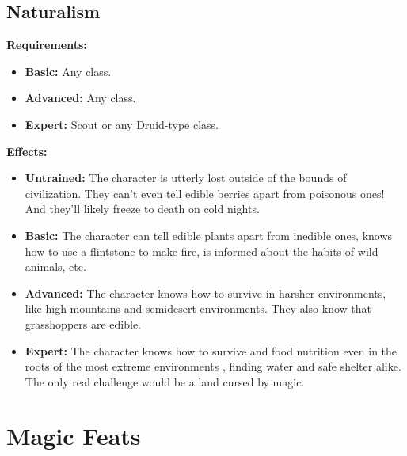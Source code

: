 \documentclass[openany,10pt,a4paper]{book}
\begin{document}
\subsection{Naturalism}
\begin{table}[!ht]
\centering
{}
\end{table}
\textbf{Requirements:}
\begin{itemize}
	\item \textbf{Basic:} Any class.
	\item \textbf{Advanced:} Any class.
	\item \textbf{Expert:} Scout or any Druid-type class.
\end{itemize}
\textbf{Effects:}
\begin{itemize}
	\item \textbf{Untrained:} The character is utterly lost outside of the bounds of civilization. They can't even tell edible berries apart from poisonous ones! And they'll likely freeze to death on cold nights.
	\item \textbf{Basic:} The character can tell edible plants apart from inedible ones, knows how to use a flintstone to make fire, is informed about the habits of wild animals, etc.
	\item \textbf{Advanced:} The character knows how to survive in harsher environments, like high mountains and semidesert environments. They also know that grasshoppers are edible.
	\item \textbf{Expert:} The character knows how to survive and food nutrition even in the roots of the most extreme environments , finding water and safe shelter alike. The only real challenge would be a land cursed by magic.
\end{itemize}\newpage
\section{Magic Feats}
\end{document}
